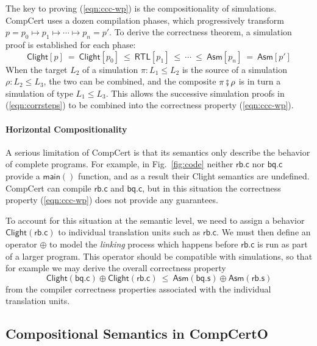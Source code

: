 \documentclass[acmsmall,screen,review,anonymous]{acmart}
\newcommand{\kw}[1]{\ensuremath{ \mathsf{#1} }}
\newcommand{\vcomp}{\fatsemi}
\begin{document}
The key to proving (\ref{eqn:ccc-wp}) is the compositionality of simulations.
CompCert uses a dozen compilation phases,
which progressively transform %
$
  p = p_0 \longmapsto p_1 \longmapsto \cdots \longmapsto p_n = p'
$.
To derive the correctness theorem,
a simulation proof is established for each phase:
\begin{equation}
  \kw{Clight}[p] \:=\:
  \kw{Clight}[p_0] \:\le\: \kw{RTL}[p_1] \:\le\: \cdots \:\le\: \kw{Asm}[p_n]
  \:=\: \kw{Asm}[p']
  \label{eqn:corrsteps}
\end{equation}
When the target $L_2$ of a simulation $\pi : L_1 \le L_2$
is the source of a simulation $\rho : L_2 \le L_3$,
the two can be combined, and the composite
$\pi \vcomp \rho$
is in turn a simulation of type $L_1 \le L_3$.
This allows
the successive simulation proofs in (\ref{eqn:corrsteps})
to be combined into the correctness property (\ref{eqn:ccc-wp}).


\paragraph{Horizontal Compositionality} %

A serious limitation of CompCert
is that its semantics
only describe the behavior of complete programs.
For example, in Fig.~\ref{fig:code}
neither $\kw{rb.c}$ nor $\kw{bq.c}$ provide a $\kw{main}()$ function,
and as a result their Clight semantics are undefined.
CompCert can compile $\kw{rb.c}$ and $\kw{bq.c}$,
but in this situation
the correctness property (\ref{eqn:ccc-wp})
does not provide any guarantees.

To account for this situation
at the semantic level,
we need to assign a behavior $\kw{Clight}(\kw{rb.c})$
to individual translation units such as $\kw{rb.c}$.
We must then define an operator $\oplus$ to model the \emph{linking} process
which happens before $\kw{rb.c}$
is run as part of a larger program.
This operator should be compatible with simulations,
so that for example we may derive the overall correctness property
\[
  \kw{Clight}(\kw{bq.c}) \oplus \kw{Clight}(\kw{rb.c})
  \:\le\:
  \kw{Asm}(\kw{bq.s}) \oplus \kw{Asm}(\kw{rb.s})
\]
from the compiler correctness properties
associated with the individual translation units.



\subsection{Compositional Semantics in CompCertO} \label{sec:compcerto} %
\end{document}
